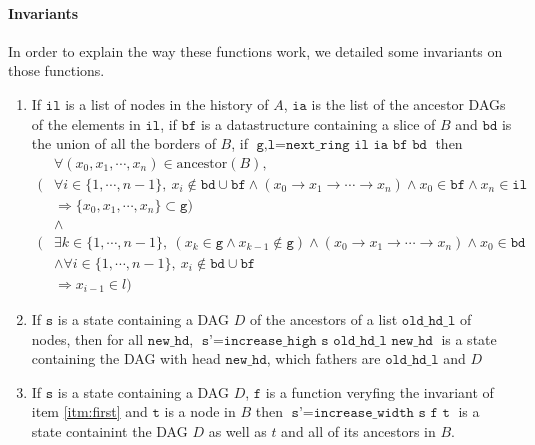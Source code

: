 \paragraph{Invariants} In order to explain the way these functions work, we detailed some invariants on those functions.
\begin{enumerate}
 \item \label{itm:first} If $\texttt{il}$ is a list of nodes in the history of $A$, $\texttt{ia}$ is the list of the ancestor DAGs of the elements in $\texttt{il}$, if $\texttt{bf}$ is a datastructure containing a slice of $B$ and $\texttt{bd}$ is the union of all the borders of $B$, if $\texttt{g,l} = \texttt{next\_ring il ia bf bd}$ then 
\begin{align*}
 &\forall (x_0,x_1,\cdots,x_n) \in \mathrm{ancestor}(B), \\
(
&\forall i \in \{1,\cdots,n-1\},\ x_i \notin \texttt{bd}\cup\texttt{bf} \wedge (x_0 \rightarrow x_1 \rightarrow \cdots \rightarrow x_n) \wedge x_0 \in \texttt{bf} \wedge x_n \in \texttt{il}
\\ &\Rightarrow \{x_0,x_1,\cdots,x_n\} \subset \texttt{g}
)\\
&\wedge \\
(
 &\exists k \in \{1,\cdots,n-1\},\ (x_k \in \texttt{g} \wedge x_{k-1} \notin \texttt{g}) \wedge (x_0 \rightarrow x_1 \rightarrow \cdots \rightarrow x_n) \wedge x_0 \in \texttt{bd} \\
 &\wedge \forall i \in \{1,\cdots,n-1\},\ x_i \notin \texttt{bd}\cup\texttt{bf} \\
 &\Rightarrow x_{i-1} \in l
)
 \end{align*}
 \item If $\texttt{s}$ is a state containing a DAG $D$ of the ancestors of a list $\texttt{old\_hd\_l}$ of nodes, then for all $\texttt{new\_hd}$, $\texttt{s'} = \texttt{increase\_high s old\_hd\_l new\_hd}$ is a state containing the DAG with head $\texttt{new\_hd}$, which fathers are $\texttt{old\_hd\_l}$ and $D$
 \item If $\texttt{s}$ is a state containing a DAG $D$, $\texttt{f}$ is a function veryfing the invariant of item \ref{itm:first} and $\texttt{t}$ is a node in $B$ then $\texttt{s'} = \texttt{increase\_width s f t}$ is a state containint the DAG $D$ as well as $t$ and all of its ancestors in $B$.
\end{enumerate}
